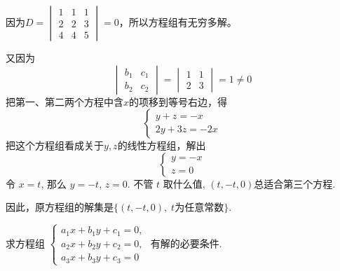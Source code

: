 \begin{solution}
  因为$D=\begin{vmatrix}
    1&1&1\\2&2&3\\4&4&5
  \end{vmatrix}=0$，所以方程组有无穷多解。

又因为
\[\begin{vmatrix}
  b_1&c_1\\b_2&c_2
\end{vmatrix}=\begin{vmatrix}
  1&1\\2&3
\end{vmatrix}=1\ne 0\]
把第一、第二两个方程中含$x$的项移到等号右边，得
\[\begin{cases}
  y+z=-x\\
  2y+3z=-2x
\end{cases}\]
把这个方程组看成关于$y,z$的线性方程组，解出
\[\begin{cases}
  y=-x\\ z=0
\end{cases}\]
令 $x=t$, 那么 $y=-t$, $z=0$. 不管 $t$ 取什么值, $(t,-t,0)$总适合第三个方程.

因此，原方程组的解集是$\{(t,-t,0),\; t \text{为任意常数}\}$.
\end{solution}

\begin{example}
  求方程组
$\begin{cases}a_1x+b_1y+c_1=0,\\a_2x+b_2y+c_2=0,\\a_3x+b_3y+c_3=0\end{cases}$
有解的必要条件.
\end{example}

